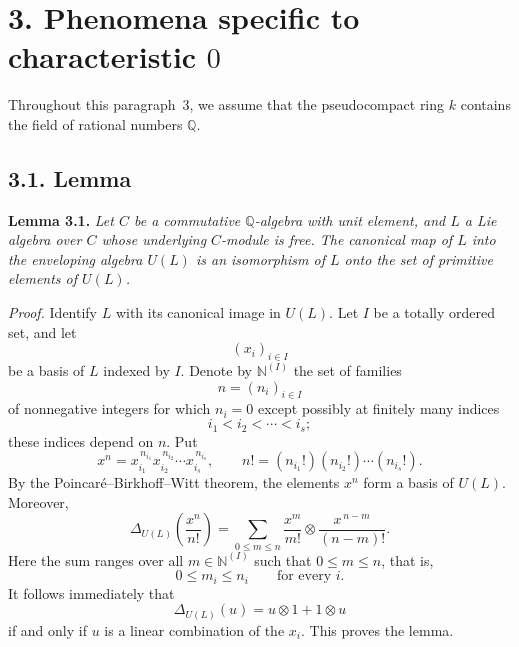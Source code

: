
\section*{3. Phenomena specific to characteristic \(0\)}
\label{sga3:VIIB:3}

Throughout this paragraph~3, we assume that the pseudocompact ring
\(k\) contains the field of rational numbers \(\mathbb Q\).

\subsection*{3.1. Lemma}
\label{sga3:VIIB:3.1}

\noindent\textbf{Lemma 3.1.}
\label{sga3:VIIB:3.1:lemma}
{\itshape Let \(C\) be a commutative \(\mathbb Q\)-algebra with unit
element, and \(L\) a Lie algebra over \(C\) whose underlying \(C\)-module is
free. The canonical map of \(L\) into the enveloping algebra \(U(L)\) is
an isomorphism of \(L\) onto the set of primitive elements of \(U(L)\).}

\textit{Proof.}
Identify \(L\) with its canonical image in \(U(L)\). Let \(I\) be
a totally ordered set, and let
\[
  (x_i)_{i\in I}
\]
be a basis of \(L\) indexed by \(I\). Denote by
\(\mathbb N^{(I)}\) the set of families
\[
  n=(n_i)_{i\in I}
\]
of nonnegative integers for which \(n_i=0\) except possibly at
finitely many indices
\[
  i_1<i_2<\cdots<i_s;
\]
these indices depend on \(n\). Put
\[
  x^n
  =
  x_{i_1}^{\,n_{i_1}}
  x_{i_2}^{\,n_{i_2}}
  \cdots
  x_{i_s}^{\,n_{i_s}},
  \qquad
  n!
  =
  (n_{i_1}!)(n_{i_2}!)\cdots(n_{i_s}!).
\]
By the Poincaré--Birkhoff--Witt theorem, the elements \(x^n\)
form a basis of \(U(L)\). Moreover,
\begin{equation}
  \Delta_{U(L)}
  \left(\frac{x^n}{n!}\right)
  =
  \sum_{0\leq m\leq n}
  \frac{x^m}{m!}
  \otimes
  \frac{x^{\,n-m}}{(n-m)!}.
  \tag{*}
  \label{sga3:VIIB:3.1:pbw-comultiplication}
\end{equation}
Here the sum ranges over all \(m\in\mathbb N^{(I)}\) such that
\(0\leq m\leq n\), that is,
\[
  0\leq m_i\leq n_i
  \qquad\text{for every }i.
\]
It follows immediately that
\[
  \Delta_{U(L)}(u)=u\otimes1+1\otimes u
\]
if and only if \(u\) is a linear combination of the \(x_i\).
This proves the lemma.
